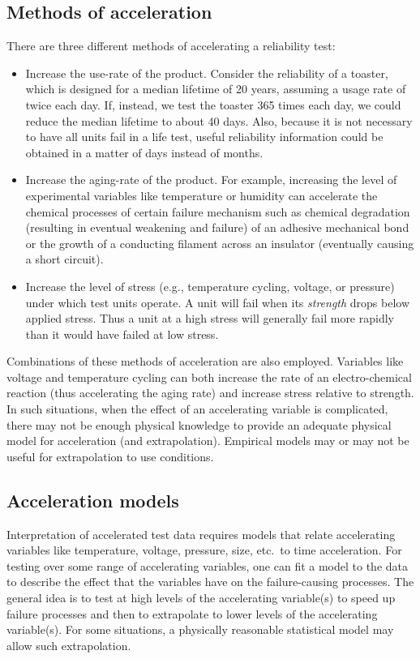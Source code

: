 \subsection{Methods of acceleration}
\label{section:methods.of.acceleration}
There are three different methods of
accelerating a reliability test:
\begin{itemize}
\item
Increase the use-rate of the product.  Consider the reliability of a
toaster, which is designed for a median lifetime of 20 years, assuming
a usage rate of twice each day.  If, instead, we  test the
toaster 365 times each day, we could reduce the median lifetime to
about 40 days.  Also, because it is not necessary to have all units
fail in a life test, useful reliability information  could be
obtained in a matter of days instead of months.
\item
Increase the aging-rate of the product. For example, increasing the
level of experimental variables like temperature or humidity can
accelerate the chemical processes of certain failure mechanism such as
chemical degradation (resulting in eventual weakening and failure) 
of an adhesive
mechanical bond or the growth of a conducting filament across an
insulator (eventually causing a short circuit).  
\item
Increase the level of stress (e.g., temperature cycling,
voltage, or pressure) under which
test units operate. A unit will fail when its {\em strength} drops
below applied stress.  Thus a unit at a high stress will generally
fail more rapidly than it would have failed at low stress.
\end{itemize}
Combinations of these methods of acceleration are also employed.
Variables like voltage and temperature cycling can both increase the
rate of an electro-chemical reaction (thus accelerating the aging
rate) and increase stress relative to strength. In such situations,
when the effect of an accelerating variable is complicated, there
may not be enough physical knowledge to provide an adequate physical
model for acceleration (and extrapolation).  Empirical models may or
may not be useful for extrapolation to use conditions.

\subsection{Acceleration models}

Interpretation of accelerated test data requires models that relate
accelerating variables like temperature, voltage, pressure, size,
etc.\  to time acceleration. For testing over some range of
accelerating variables, one can fit a model to the data to describe
the effect that the variables have on the failure-causing processes.
The general idea is to test at high levels of the accelerating
variable(s) to speed up failure processes and then to extrapolate to
lower levels of the accelerating variable(s). For some situations, a
physically reasonable statistical model may allow such
extrapolation.

